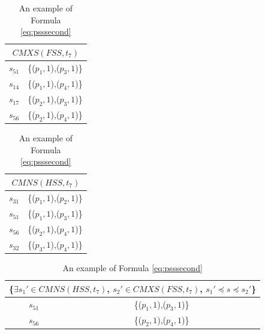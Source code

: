 { \begin{table}[htbp]
  \centering
  \caption{An example of Formula \ref{eq:psssecond}}
  \label{examleofeqpsssecond}
  \begin{tabular}{|c|c|} \hline
     \multicolumn{2}{|c|}{$CMXS(FSS, t_{7})$} \\ \hline
   $s_{51}$ & \{($p_{1}, 1$),($p_{3}, 1$)\} \\
   $s_{14}$ & \{($p_{1}, 1$),($p_{4}, 1$)\} \\
   $s_{17}$ & \{($p_{2}, 1$),($p_{3}, 1$)\} \\
   $s_{56}$ & \{($p_{2}, 1$),($p_{4}, 1$)\} \\
    \hline
    \end{tabular}%
  \quad
    \begin{tabular}{|c|c|} \hline
     \multicolumn{2}{|c|}{$CMNS(HSS, t_{7})$} \\ \hline
   $s_{31}$ & \{($p_{1}, 1$),($p_{2}, 1$)\} \\
   $s_{51}$ & \{($p_{1}, 1$),($p_{3}, 1$)\} \\
   $s_{56}$ & \{($p_{2}, 1$),($p_{4}, 1$)\} \\
   $s_{32}$ & \{($p_{3}, 1$),($p_{4}, 1$)\} \\
    \hline
    \end{tabular}%
   \quad
    \begin{tabular}{|c|c|} \hline
   \multicolumn{2}{|c|}{\{$\exists s_{1}' \in CMNS(HSS, t_{7})$, $s_{2}' \in CMXS(FSS, t_{7})$, $s_{1}' \preceq s \preceq s_{2}'$\}}\\ \hline
   $s_{51}$ & \{($p_{1}, 1$),($p_{3}, 1$)\} \\
   $s_{56}$ & \{($p_{2}, 1$),($p_{4}, 1$)\} \\ \hline
    \end{tabular}%
\end{table}



}
